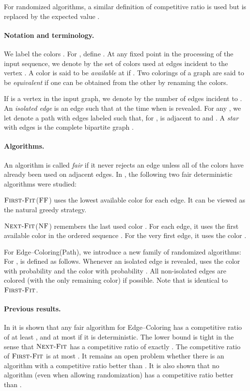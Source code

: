 \documentclass[smallextended]{svjour3}
\def\mck{{\sc Edge--Coloring}\xspace}
\def\mcpath{{\sc Edge--Coloring(Path)}\xspace}
\newcommand{\NF}{\ensuremath{\operatorname{\textsc{Next-Fit}}}\xspace}
\newcommand{\FF}{\ensuremath{\operatorname{\textsc{First-Fit}}}\xspace}
\newcommand{\nf}{\ensuremath{\operatorname{\textsc{NF}}}\xspace}
\newcommand{\ff}{\ensuremath{\operatorname{\textsc{FF}}}\xspace}
\begin{document}
For randomized algorithms, a similar definition of competitive ratio
is used but  is replaced by the expected value
.


\paragraph{Notation and terminology.}
We label the  colors . For , define . At any fixed point in the processing of the input sequence, we
denote by  the set of colors used at edges incident to the vertex . A color 
is said to be \emph{available} at  if .
Two colorings of a graph are said to be \emph{equivalent} if one can
 be obtained from the other by renaming the colors. 

If  is a vertex in the input graph, we denote by  the number of edges incident to . An \emph{isolated edge}  is an edge such that  at the time when  is revealed.
For any , we let  denote a
 path with  edges labeled such that, for ,  is adjacent to  and .
A \emph{star} with 
edges is the complete bipartite graph .

 
\paragraph{Algorithms.}
An algorithm is called \emph{fair} if it never rejects an edge unless all of the  colors have already been used on adjacent edges.
In \cite{kedge}, the following two fair deterministic algorithms were studied:

\FF (\ff) uses the lowest available color for each edge. It can be viewed as the
natural greedy strategy.

\NF (\nf) remembers the last used color . For each edge, it
uses the first available color in the ordered sequence . For the very first edge, it uses the color .

For \mcpath, we introduce a new family of randomized algorithms:
For ,  is defined as follows.
Whenever an isolated edge is revealed,  uses the color  with
 probability  and the color  with probability . 
All non-isolated edges are colored (with the only remaining color) if
 possible.
Note that  is identical to \FF.

\paragraph{Previous results.}
In \cite{kedge} it is shown that any fair algorithm for \mck has a competitive ratio of at least , and at most  if it is deterministic. The lower bound is tight in the sense that \NF has a competitive ratio of exactly . The competitive ratio of \FF is at most . It remains an open problem whether there is an algorithm with a competitive ratio better than .
It is also shown that no algorithm (even when
allowing randomization) has a competitive ratio better than .
\end{document}
